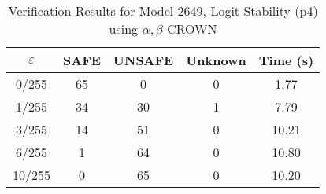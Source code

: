\begin{table}[htbp]
\centering
\caption{Verification Results for Model 2649, Logit Stability (p4) using $\alpha,\beta$-CROWN}
\label{tab:model2649_p4_abcrown}
\begin{tabular}{|c|c|c|c|c|}
\hline
$\varepsilon$ & SAFE & UNSAFE & Unknown & Time (s) \\ \hline
0/255 & 65 & 0 & 0 & 1.77 \\ \hline
1/255 & 34 & 30 & 1 & 7.79 \\ \hline
3/255 & 14 & 51 & 0 & 10.21 \\ \hline
6/255 & 1 & 64 & 0 & 10.80 \\ \hline
10/255 & 0 & 65 & 0 & 10.20 \\ \hline
\end{tabular}
\end{table}

